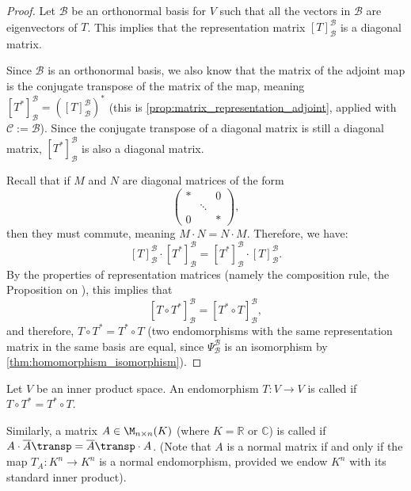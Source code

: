 \begin{proof}
Let $\mathcal{B}$ be an orthonormal basis for $V$ such that all the vectors in $\mathcal{B}$ are eigenvectors of $T$. This implies that the representation matrix $[T]_{\mathcal{B}}^{\mathcal{B}}$ is a diagonal matrix. 

Since $\mathcal{B}$ is an orthonormal basis, we also know that the matrix of the adjoint map is the conjugate transpose of the matrix of the map, meaning $[T^*]_{\mathcal{B}}^{\mathcal{B}} = \left([T]_{\mathcal{B}}^{\mathcal{B}}\right)^*$ (this is \cref{prop:matrix_representation_adjoint}, applied with $\mathcal{C} := \mathcal{B}$). Since the conjugate transpose of a diagonal matrix is still a diagonal matrix, $[T^*]_{\mathcal{B}}^{\mathcal{B}}$ is also a diagonal matrix. 

Recall that if $M$ and $N$ are diagonal matrices of the form
\[
    \begin{pmatrix}
        * & & 0 \\
        & \ddots & \\
        0 & & *
    \end{pmatrix},
\]
then they must commute, meaning $M \cdot N = N \cdot M$. Therefore, we have:
\[
    [T]_{\mathcal{B}}^{\mathcal{B}} \cdot [T^*]_{\mathcal{B}}^{\mathcal{B}} = [T^*]_{\mathcal{B}}^{\mathcal{B}} \cdot [T]_{\mathcal{B}}^{\mathcal{B}}.
\]
By the properties of representation matrices (namely the composition rule, the Proposition on ), this implies that
\[
    [T \circ T^*]_{\mathcal{B}}^{\mathcal{B}} = [T^* \circ T]_{\mathcal{B}}^{\mathcal{B}},
\]
and therefore, $T \circ T^* = T^* \circ T$ (two endomorphisms with the same representation matrix in the same basis are equal, since $\Psi_{\mathcal{B}}^{\mathcal{B}}$ is an isomorphism by \cref{thm:homomorphism_isomorphism}).
\end{proof}

\begin{definition}
\label{def:normal_endomorphism}
Let $V$ be an inner product space. An endomorphism $T \colon V \to V$ is called  if $T \circ T^* = T^* \circ T$. 

Similarly, a matrix $A \in \M_{n \times n}(K)$ (where $K = \mathbb{R}$ or $\mathbb{C}$) is called  if $A \cdot \overline{A}\transp = \overline{A}\transp \cdot A$. (Note that $A$ is a normal matrix if and only if the map $T_A \colon K^n \to K^n$ is a normal endomorphism, provided we endow $K^n$ with its standard inner product).
\end{definition}

